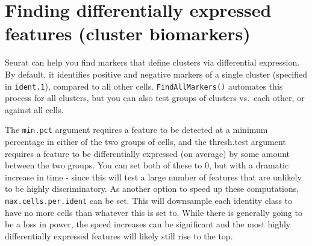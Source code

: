 \documentclass[
]{book}
\begin{document}
\hypertarget{section-11}{%
\subsubsection*{}\label{section-11}}

\hypertarget{finding-differentially-expressed-features-cluster-biomarkers}{%
\section{Finding differentially expressed features (cluster biomarkers)}\label{finding-differentially-expressed-features-cluster-biomarkers}}

Seurat can help you find markers that define clusters via differential expression. By default, it identifies positive and negative markers of a single cluster (specified in \texttt{ident.1}), compared to all other cells. \texttt{FindAllMarkers()} automates this process for all clusters, but you can also test groups of clusters vs.~each other, or against all cells.

The \texttt{min.pct} argument requires a feature to be detected at a minimum percentage in either of the two groups of cells, and the thresh.test argument requires a feature to be differentially expressed (on average) by some amount between the two groups. You can set both of these to 0, but with a dramatic increase in time - since this will test a large number of features that are unlikely to be highly discriminatory. As another option to speed up these computations, \texttt{max.cells.per.ident} can be set. This will downsample each identity class to have no more cells than whatever this is set to. While there is generally going to be a loss in power, the speed increases can be significant and the most highly differentially expressed features will likely still rise to the top.
\end{document}
